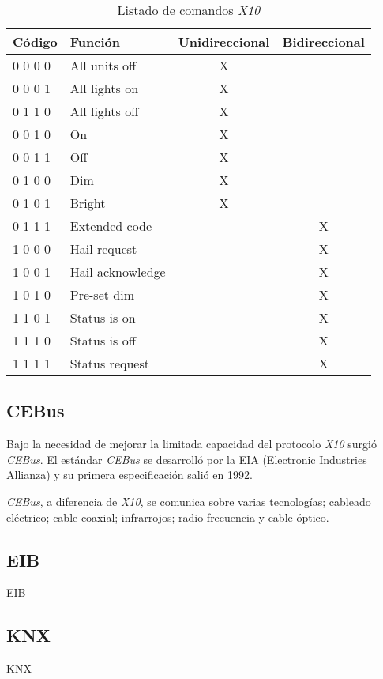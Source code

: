 \begin{table}[!hbt]
    \begin{center}
        \begin{tabular}{|l |l | c | c |}
            \hline
            Código & Función & Unidireccional & Bidireccional \\
            \hline
            0 0 0 0 & All units off & X &  \\
            \hline
            0 0 0 1 & All lights on & X &  \\
            \hline
            0 1 1 0 & All lights off & X &  \\
            \hline
            0 0 1 0 & On & X &  \\
            \hline
            0 0 1 1 & Off & X &  \\
            \hline
            0 1 0 0 & Dim & X &  \\
            \hline
            0 1 0 1 & Bright & X &  \\
            \hline
            0 1 1 1 & Extended code & & X \\
            \hline
            1 0 0 0 & Hail request & & X \\
            \hline
            1 0 0 1 & Hail acknowledge & & X \\
            \hline
            1 0 1 0 & Pre-set dim & & X \\
            \hline
            1 1 0 1 & Status is on & & X \\
            \hline
            1 1 1 0 & Status is off & & X \\
            \hline
            1 1 1 1 & Status request & & X \\
            \hline
        \end{tabular}
        \caption{Listado de comandos \emph{X10}}
    \end{center}
\end{table}

\subsection{CEBus}

Bajo la necesidad de mejorar la limitada capacidad del protocolo \emph{X10} surgió \emph{CEBus}. El estándar \emph{CEBus} se desarrolló por la EIA (Electronic Industries Allianza) y su primera especificación salió en 1992.

\emph{CEBus}, a diferencia de \emph{X10}, se comunica sobre varias tecnologías; cableado eléctrico; cable coaxial; infrarrojos; radio frecuencia y cable óptico.

\subsection{EIB}

EIB

\subsection{KNX}

KNX
